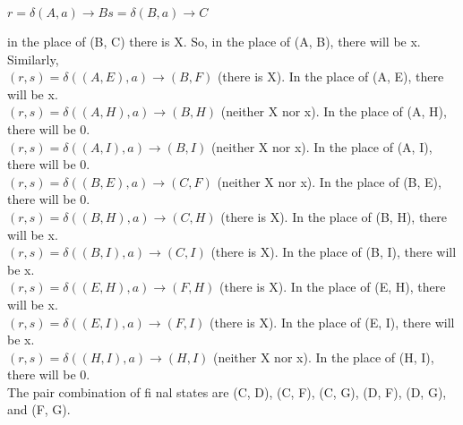 \documentclass{article}
\begin{document}
\vspace*{0.5cm}
\begin{center}
  $r = \delta(A, a) \rightarrow B s = \delta(B, a) \rightarrow C$
\end{center}
in the place of (B, C) there is X. So, in the place of (A, B), there will be x.\\
\hspace*{0.4cm} Similarly,\\

\vspace*{0.1cm}
\hspace*{0.4cm} $(r, s) = \delta((A, E), a) \rightarrow (B, F)$ (there is X). In the place of (A, E), there will be x.\\
\hspace*{0.4cm} $(r, s) = \delta((A, H), a) \rightarrow (B, H)$ (neither X nor x). In the place of (A, H), there will be 0.\\
\hspace*{0.4cm} $(r, s) = \delta((A, I), a) \rightarrow (B, I)$ (neither X nor x). In the place of (A, I), there will be 0.\\
\hspace*{0.4cm} $(r, s) = \delta((B, E), a) \rightarrow (C, F)$ (neither X nor x). In the place of (B, E), there will be 0.\\
\hspace*{0.4cm} $(r, s) = \delta((B, H), a) \rightarrow (C, H)$ (there is X). In the place of (B, H), there will be x.\\
\hspace*{0.4cm} $(r, s) = \delta((B, I), a) \rightarrow (C, I)$ (there is X). In the place of (B, I), there will be x.\\
\hspace*{0.4cm} $(r, s) = \delta((E, H), a) \rightarrow (F, H)$ (there is X). In the place of (E, H), there will be x.\\
\hspace*{0.4cm} $(r, s) = \delta((E, I), a) \rightarrow (F, I)$ (there is X). In the place of (E, I), there will be x.\\
\hspace*{0.4cm} $(r, s) = \delta((H, I), a) \rightarrow (H, I)$ (neither X nor x). In the place of (H, I), there will be 0.\\

\vspace*{0.1cm}
 The pair combination of fi nal states are (C, D), (C, F), (C, G), (D, F), (D, G), and (F, G).\\
\end{document}
